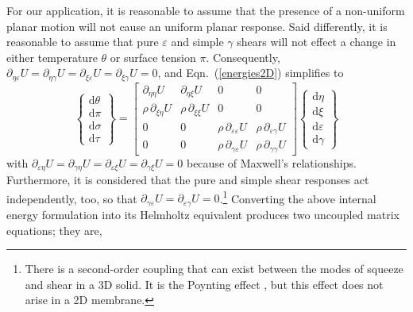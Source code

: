 For our application, it is reasonable to assume that the presence of a non-uniform planar motion will not cause an uniform planar response.  Said differently, it is reasonable to assume that pure $\varepsilon$ and simple $\gamma$ shears will not effect a change in either temperature $\theta$ or surface tension $\pi$.  Consequently, $\partial_{\eta\varepsilon} U = \partial_{\eta\gamma} U = \partial_{\xi\varepsilon} U = \partial_{\xi\gamma} U = 0$, and Eqn.~(\ref{energies2D}) simplifies to
\begin{displaymath}
\left\{ \begin{matrix}
\mathrm{d} \theta \\ \mathrm{d} \pi \\
\mathrm{d} \sigma \\ \mathrm{d} \tau
\end{matrix} \right\} = \begin{bmatrix}
\partial_{\eta\eta} U & 
\partial_{\eta\xi} U & 
0 & 0 \\ 
\rho \, \partial_{\xi\eta} U & 
\rho \, \partial_{\xi\xi} U & 
0 & 0 \\
0 & 0 & 
\rho \, \partial_{\varepsilon\varepsilon} U & 
\rho \, \partial_{\varepsilon\gamma} U \\
0 & 0 & 
\rho \, \partial_{\gamma\varepsilon} U & 
\rho \, \partial_{\gamma\gamma} U 
\end{bmatrix} 
\left\{ \begin{matrix}
\mathrm{d}\eta \\ \mathrm{d} \xi \\
\mathrm{d} \varepsilon \\ \mathrm{d} \gamma
\end{matrix} \right\} 
\end{displaymath}
with $\partial_{\varepsilon\eta} U = \partial_{\gamma\eta} U = \partial_{\varepsilon\xi} U = \partial_{\gamma\xi} U = 0$ because of Maxwell's relationships.  Furthermore, it is considered that the pure and simple shear responses act independently, too, so that $\partial_{\gamma\varepsilon} U = \partial_{\varepsilon\gamma} U = 0$.\footnote{
    There is a second-order coupling that can exist between the modes of squeeze and shear in a 3D solid.  It is the Poynting effect \cite{FreedZamani19}, but this effect does not arise in a 2D membrane.
}
Converting the above internal energy formulation into its Helmholtz equivalent produces two uncoupled matrix equations; they are,
